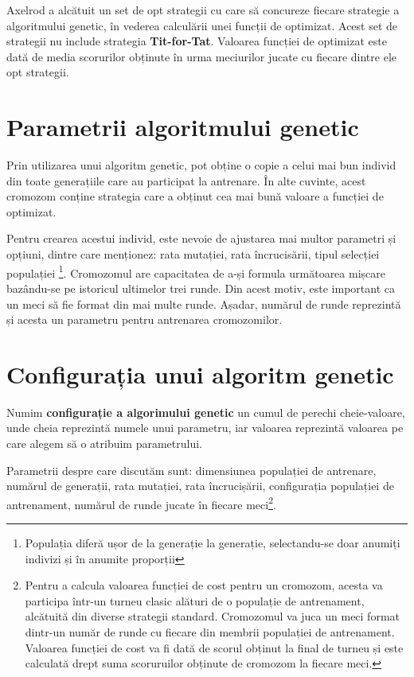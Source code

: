 Axelrod a alcătuit un set de opt strategii cu care să concureze fiecare strategie a algoritmului genetic, în vederea calculării unei funcții de optimizat. Acest set de strategii nu include strategia \textbf{Tit-for-Tat}. Valoarea funcției de optimizat este dată de media scorurilor obținute în urma meciurilor jucate cu fiecare dintre ele opt strategii.

\section {Parametrii algoritmului genetic}

Prin utilizarea unui algoritm genetic, pot obține o copie a celui mai bun individ din toate generațiile care au participat la antrenare. În alte cuvinte, acest cromozom conține strategia care a obținut cea mai bună valoare a funcției de optimizat. 

Pentru crearea acestui individ, este nevoie de ajustarea mai multor parametri și opțiuni, dintre care menționez: rata mutației, rata încrucisării, tipul selecției populației \footnote{Populația diferă ușor de la generație la generație, selectandu-se doar anumiți indivizi și în anumite proporții}. Cromozomul are capacitatea de a-și formula următoarea mișcare bazându-se pe istoricul ultimelor trei runde. Din acest motiv, este important ca un meci să fie format din mai multe runde. Așadar, numărul de runde reprezintă și acesta un parametru pentru antrenarea cromozomilor. 

\section{Configurația unui algoritm genetic}

Numim \textbf{configurație a algorimului genetic} un cumul de perechi cheie-valoare, unde cheia reprezintă numele unui parametru, iar valoarea reprezintă valoarea pe care alegem să o atribuim parametrului.

Parametrii despre care discutăm sunt: dimensiunea populației de antrenare, numărul de generații, rata mutației, rata încrucișării, configurația populației de antrenament, numărul de runde jucate în fiecare meci\footnote{Pentru a calcula valoarea funcției de cost pentru un cromozom, acesta va participa într-un turneu clasic alături de o populație de antrenament, alcătuită din diverse strategii standard. Cromozomul va juca un meci format dintr-un număr de runde cu fiecare din membrii populației de antrenament. Valoarea funcției de cost va fi dată de scorul obținut la final de turneu și este calculată drept suma scoruruilor obținute de cromozom la fiecare meci.}.  


